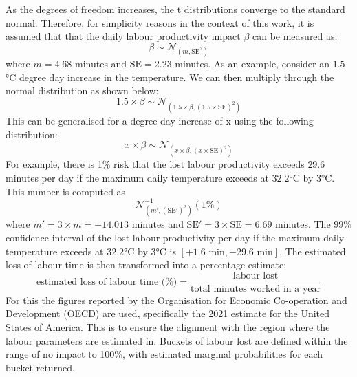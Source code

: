 As the degrees of freedom increases, the t distributions converge to the standard normal. Therefore, for simplicity reasons in the context of this work, it is assumed that that the daily labour productivity impact $\beta$ can be measured as:
\begin{equation}
    \label{Eq:uncertainty1}
        \beta \sim \mathcal{N}_{\left(m,\text{SE}^{2}\right)}
\end{equation}
where $m = 4.68$ minutes and $\text{SE}=2.23$ minutes. As an example, consider an $1.5$°C degree day increase in the temperature. We can then multiply through the normal distribution as shown below:
\begin{equation}
    \label{Eq:uncertainty2}
    1.5 \times \beta \sim \mathcal{N}_{\left(1.5 \times \beta,(1.5 \times \text{SE})^{2}\right)}
\end{equation}
This can be generalised for a degree day increase of x using the following distribution:
\begin{equation}
    \label{Eq:uncertainty3}
    x \times \beta \sim \mathcal{N}_{\left(x \times \beta,\left(x\times\text{SE}\right)^{2}\right)}
\end{equation}
For example, there is 1\% risk that the lost labour productivity exceeds $29.6$ minutes per day if the maximum daily temperature exceeds at $32.2$°C by $3$°C. This number is computed as
$$
\mathcal{N}^{-1}_{\left(m',\left(\text{SE}'\right)^2\right)}\left(1\%\right)
$$
where $m'= 3 \times m = -14.013$ minutes and $\text{SE}'= 3 \times \text{SE} = 6.69$ minutes. The $99\%$ confidence interval of the lost labour productivity per day if the maximum daily temperature exceeds at $32.2$°C by $3$°C is $\left[+1.6\text{ min}, -29.6\text{ min}\right]$.
The estimated loss of labour time is then transformed into a percentage estimate:
\begin{equation}
    \label{Eq:uncertainty3}
    \text{estimated loss of labour time (\%)}=  \frac{\text{labour lost}}{\text{total minutes worked in a year}}
\end{equation}
For this the figures reported by the Organisation for Economic Co-operation and Development (OECD) are used, specifically the 2021 estimate for the United States of America. This is to ensure the alignment with the region where the labour parameters are estimated in. Buckets of labour lost are defined within the range of no impact to 100\%, with estimated marginal probabilities for each bucket returned.

